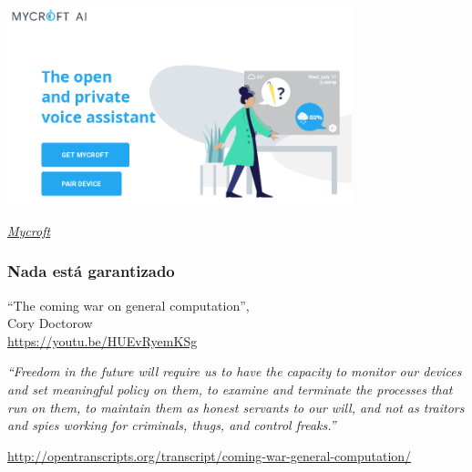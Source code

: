 \documentclass[17pt,aspectratio=169,hyperref=pdfusetitle]{beamer}
\begin{document}
\begin{frame}[fragile]

  \begin{center}
  \includegraphics[width=10cm]{figs/mycroft}
  \end{center}

  \begin{flushright}
    {\em
      \href{https://mycroft.ai}{Mycroft}
      }
  \end{flushright}
  
\end{frame}


\begin{frame}[fragile]
  \frametitle{Nada está garantizado}

  ``The coming war on general computation'', \\
  Cory Doctorow \\

  \url{https://youtu.be/HUEvRyemKSg}
\end{frame}

\begin{frame}[fragile]

  {\em
  ``Freedom in the future will require us to have the capac­i­ty to mon­i­tor our devices and set mean­ing­ful pol­i­cy on them, to exam­ine and ter­mi­nate the process­es that run on them, to main­tain them as hon­est ser­vants to our will, and not as trai­tors and spies work­ing for crim­i­nals, thugs, and con­trol freaks.''
  }

  \begin{flushright}
  {\small
    \url{http://opentranscripts.org/transcript/coming-war-general-computation/}
  }
  \end{flushright}
  
\end{frame}
\end{document}
